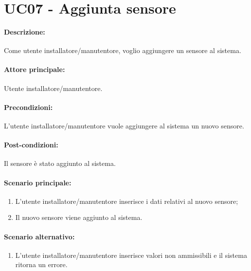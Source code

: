\section{UC07 - Aggiunta sensore}

\paragraph{Descrizione:}
Come utente installatore/manutentore, voglio aggiungere un sensore al sistema.

\paragraph{Attore principale:}
Utente installatore/manutentore.

\paragraph{Precondizioni:}
L'utente installatore/manutentore vuole aggiungere al sistema un nuovo sensore.

\paragraph{Post-condizioni:}
Il sensore è stato aggiunto al sistema.

\paragraph{Scenario principale:}
\begin{enumerate}
    \item L'utente installatore/manutentore inserisce i dati relativi al nuovo sensore;
    \item Il nuovo sensore viene aggiunto al sistema.
\end{enumerate}

\paragraph{Scenario alternativo:}
\begin{enumerate}
    \item L'utente installatore/manutentore inserisce valori non ammissibili e il sistema ritorna un errore.
\end{enumerate}
